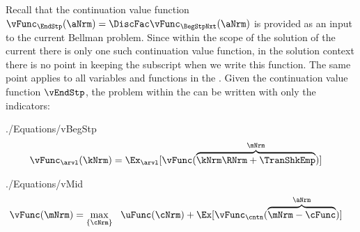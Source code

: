 \documentclass[\econtexRoot/SolvingMicroDSOPs]{subfiles}
\begin{document}
Recall that the continuation value function $\vFunc_{\EndStp}(\aNrm)=\DiscFac \vFunc_{\BegStpNxt}(\aNrm)$ is provided as an input to the current {\stg} Bellman problem.  Since within the scope of the solution of the current {\stg} there is only one such continuation value function, in the solution context there is no point in keeping the {\interval} subscript when we write this function.  The same point applies to all variables and functions in the {\stg}.  Given the continuation value function $\vEndStp$, the problem within the {\stg} can be written with only the {\move} indicators:
\begin{verbatimwrite}{./Equations/vBegStp}
  \begin{equation}\begin{gathered}\begin{aligned}
        \vFunc_{\arvl}(\kNrm) & = \Ex_{\arvl}[\vFunc(\overbrace{\kNrm \RNrm + \TranShkEmp}^{\mNrm})]  \label{eq:vBegStp}
      \end{aligned}\end{gathered}\end{equation}
\end{verbatimwrite}
\unskip
\begin{verbatimwrite}{./Equations/vMid}
  \begin{equation}\begin{gathered}\begin{aligned}
        \vFunc(\mNrm) & = \max_{\{{\cNrm}\}}~~\uFunc({\cNrm}) +\Ex[ \vFunc_{\cntn}(\overbrace{\mNrm-\cFunc}^{\aNrm})] \label{eq:vMid}
      \end{aligned}\end{gathered}\end{equation}
\end{verbatimwrite}
\unskip
\end{document}
